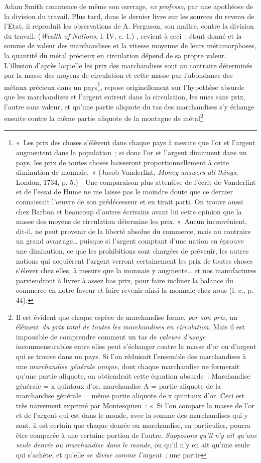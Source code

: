 \documentclass[french,twoside]{book} %
\begin{document}
{ Adam Smith commence de même son ouvrage, \emph{ex professo}, par une apothéose de la division du travail. Plus tard, dans le dernier livre sur les sources du revenu de l’Etat, il reproduit les observations de A. Ferguson, son maître, contre la division du travail. (\emph{Wealth of Nations}, l. IV, c. 1.)
}, revient à ceci : étant donné et la somme de valeur des marchandises et la vitesse moyenne de leurs métamorphoses, la quantité du métal précieux en circulation dépend de sa propre valeur. L’illusion d’après laquelle les prix des marchandises sont au contraire déterminés par la masse des moyens de circulation et cette masse par l’abondance des métaux précieux dans un pays\footnote{« Les prix des choses s’élèvent dans chaque pays à mesure que l’or et l’argent augmentent dans la population ; si donc l’or et l’argent diminuent dans un pays, les prix de toutes choses baisseront proportionnellement à cette diminution de monnaie. » (Jacob Vanderlint, \emph{Money answers all things}, London, 1734, p. 5.) ‑ Une comparaison plus attentive de l’écrit de Vanderlint et de l’essai de Hume ne me laisse pas le moindre doute que ce dernier connaissait l’œuvre de son prédécesseur et en tirait parti. On trouve aussi chez Barbon et beaucoup d’autres écrivains avant lui cette opinion que la masse des moyens de circulation détermine les prix. « Aucun inconvénient, dit‑il, ne peut provenir de la liberté absolue du commerce, mais au contraire un grand avantage… puisque si l’argent comptant d’une nation en éprouve une diminution, ce que les prohibitions sont chargées de prévenir, les autres nations qui acquièrent l’argent verront certainement les prix de toutes choses s’élever chez elles, à mesure que la monnaie y augmente… et nos manufactures parviendront à livrer à assez bas prix, pour faire incliner la balance du commerce en notre faveur et faire revenir ainsi la monnaie chez nous (l. c., p. 44).}, repose originellement sur l’hypothèse absurde que les marchandises et l’argent entrent dans la circulation, les unes sans prix, l’autre sans valeur, et qu’une partie aliquote du tas des marchandises s’y échange ensuite contre la même partie aliquote de la montagne de métal\footnote{Il est évident que chaque espèce de marchandise forme, \emph{par son prix}, un élément \emph{du prix total de toutes les marchandises en circulation.} Mais il est impossible de comprendre comment un tas de \emph{valeurs d’usage} incommensurables entre elles peut s’échanger contre la masse d’or ou d’argent qui se trouve dans un pays. Si l’on réduisait l’ensemble des marchandises à une \emph{marchandise générale unique}, dont chaque marchandise ne formerait qu’une partie aliquote, on obtiendrait cette équation absurde : Marchandise générale = x quintaux d’or, marchandise A = partie aliquote de la marchandise générale = même partie aliquote de x quintaux d’or. Ceci est très naïvement exprimé par Montesquieu : « Si l’on compare la masse de l’or et de l’argent qui est dans le monde, avec la somme des marchandises qui y sont, il est certain que chaque denrée ou marchandise, en particulier, pourra être comparée à une certaine portion de l’autre. \emph{Supposons qu’il n’y ait qu’une seule denrée ou marchandise dans le monde}, ou qu’il n’y en ait qu’une seule qui s’achète, et qu’elle \emph{se divise comme l’argent ;} une partie }
\end{document}
